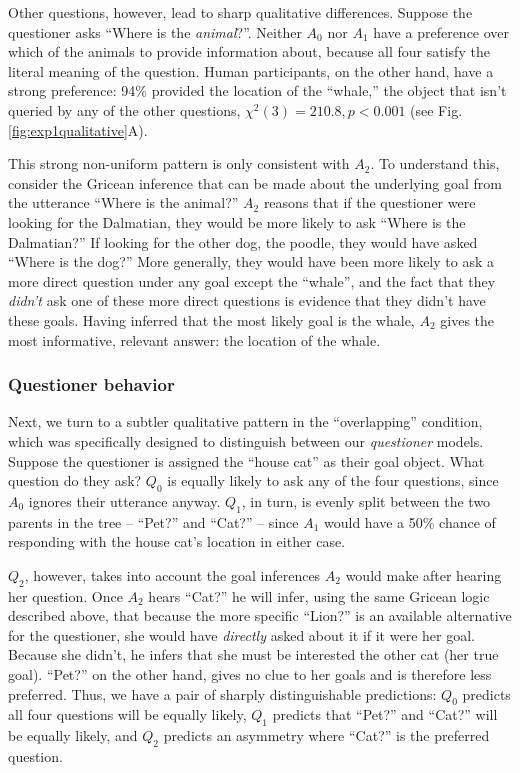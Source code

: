 \documentclass[12pt, floatsintext, jou]{apa6}
\begin{document}
Other questions, however, lead to sharp qualitative differences.
Suppose the questioner asks ``Where is the \emph{animal}?''. 
Neither $A_0$ nor $A_1$ have a preference over which of the animals to provide information about, because all four satisfy the literal meaning of the question. 
Human participants, on the other hand, have a strong preference: 94\% provided the location of the ``whale,'' the object that isn't queried by any of the other questions, $\chi^2(3) = 210.8, p < 0.001$ (see Fig. \ref{fig:exp1qualitative}A).

This strong non-uniform pattern %
is only consistent with $A_2$. 
To understand this, consider the Gricean inference that can be made about the underlying goal from the utterance ``Where is the animal?''
$A_2$ reasons that if the questioner were looking for the Dalmatian, they would be more likely to ask ``Where is the Dalmatian?'' 
If looking for the other dog, the poodle, they would have asked ``Where is the dog?''
More generally, they would have been more likely to ask a more direct question under any goal except the ``whale'', and the fact that they \emph{didn't} ask one of these more direct questions is evidence that they didn't have these goals.
Having inferred that the most likely goal is the whale, $A_2$ gives the most informative, relevant answer: the location of the whale.

\subsubsection{Questioner behavior}
Next, we turn to a subtler qualitative pattern in the ``overlapping'' condition, which was specifically designed to distinguish between our \emph{questioner} models. 
Suppose the questioner is assigned the ``house cat'' as their goal object. 
What question do they ask? 
$Q_0$ is equally likely to ask any of the four questions, since $A_0$ ignores their utterance anyway. 
$Q_1$, in turn, is evenly split between the two parents in the tree -- ``Pet?'' and ``Cat?'' -- since $A_1$ would have a 50\% chance of responding with the house cat's location in either case. 

$Q_2$, however, takes into account the goal inferences $A_2$ would make after hearing her question. 
Once $A_2$ hears ``Cat?'' he will infer, using the same Gricean logic described above, that because the more specific ``Lion?'' is an available alternative for the questioner, she would have \emph{directly} asked about it if it were her goal. 
Because she didn't, he infers that she must be interested the other cat (her true goal). 
``Pet?'' on the other hand, gives no clue to her goals and is therefore less preferred. 
Thus, we have a pair of sharply distinguishable predictions: $Q_0$ predicts all four questions will be equally likely, $Q_1$ predicts that ``Pet?'' and ``Cat?'' will be equally likely, and $Q_2$ predicts an asymmetry where ``Cat?'' is the preferred question.
\end{document}
